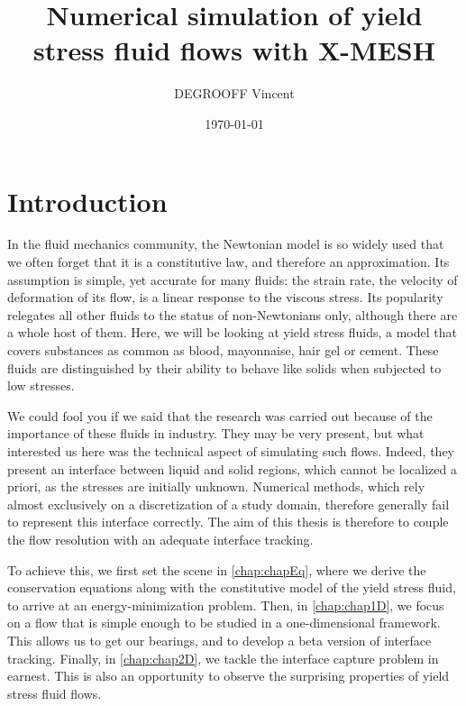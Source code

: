 \documentclass[11 pt]{report}
\title{{\Huge Numerical simulation of yield stress fluid flows with X-MESH}}
\author{\textsc{DEGROOFF} Vincent}
\date{\today}
\begin{document}
 
%
\maketitle

\setcounter{tocdepth}{1}
\tableofcontents





\clearpage
{}
\chapter*{Introduction}
In the fluid mechanics community, the Newtonian model is so widely used that we often forget that it is a constitutive law, and therefore an approximation. Its assumption is simple, yet accurate for many fluids: the strain rate, the velocity of deformation of its flow, is a linear response to the viscous stress. Its popularity relegates all other fluids to the status of non-Newtonians only, although there are a whole host of them. Here, we will be looking at yield stress fluids, a model that covers substances as common as blood, mayonnaise, hair gel or cement. These fluids are distinguished by their ability to behave like solids when subjected to low stresses.

We could fool you if we said that the research was carried out because of the importance of these fluids in industry. They may be very present, but what interested us here was the technical aspect of simulating such flows. Indeed, they present an interface between liquid and solid regions, which cannot be localized a priori, as the stresses are initially unknown. Numerical methods, which rely almost exclusively on a discretization of a study domain, therefore generally fail to represent this interface correctly. The aim of this thesis is therefore to couple the flow resolution with an adequate interface tracking.

To achieve this, we first set the scene in \cref{chap:chapEq}, where we derive the conservation equations along with the constitutive model of the yield stress fluid, to arrive at an energy-minimization problem. Then, in \cref{chap:chap1D}, we focus on a flow that is simple enough to be studied in a one-dimensional framework. This allows us to get our bearings, and to develop a beta version of interface tracking. Finally, in \cref{chap:chap2D}, we tackle the interface capture problem in earnest. This is also an opportunity to observe the surprising properties of yield stress fluid flows.
\end{document}
